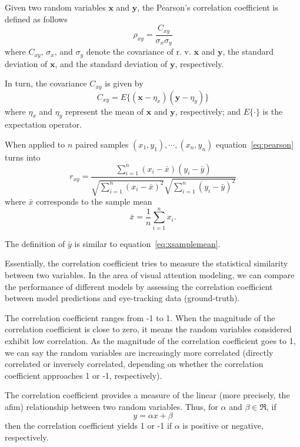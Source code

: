 Given two random variables $\mathbf{x}$ and $\mathbf{y}$, the Pearson's correlation coefficient is defined as follows
\begin{equation}
  \rho_{xy} = \frac{C_{xy}}{\sigma_x\sigma_y}
  \label{eq:pearson}
\end{equation}
where $C_{xy}$, $\sigma_x$, and $\sigma_y$ denote the covariance of r. v. $\mathbf{x}$ and $\mathbf{y}$, the standard deviation of $\mathbf{x}$, and the standard deviation of $\mathbf{y}$, respectively.

In turn, the covariance $C_{xy}$ is given by
\begin{equation}
  C_{xy} = E\{(\mathbf{x}-\eta_x)(\mathbf{y} - \eta_y)\}
  \label{eq:cov}
\end{equation}
where $\eta_x$ and $\eta_y$ represent the mean of $\mathbf{x}$ and $\mathbf{y}$, respectively; and $E\{\cdot\}$ is the expectation operator.

When applied to $n$ paired samples $(x_1,y_1),\cdots,(x_n,y_n)$ equation~\ref{eq:pearson} turns into
\begin{equation}
  r_{xy} = \frac{\sum_{i=1}^n(x_i-\bar x)(y_i - \bar y)}{\sqrt{\sum_{i=1}^n(x_i-\bar x)^2}\sqrt{\sum_{i=1}^n(y_i-\bar y)^2}}
\end{equation}
where $\bar x$ corresponds to the sample mean
\begin{equation}
  \bar x = \frac{1}{n}\sum_{i=1}^n x_i.
  \label{eq:xsamplemean}
\end{equation}

The definition of $\bar y$ is similar to equation~\ref{eq:xsamplemean}.

Essentially, the correlation coefficient tries to measure the statistical similarity between two variables. In the area of visual attention modeling, we can compare the performance of different models by assessing the correlation coefficient between model predictions and eye-tracking data (ground-truth).

The correlation coefficient ranges from -1 to 1. When the magnitude of the correlation coefficient is close to zero, it means the random variables considered exhibit low correlation. As the magnitude of the correlation coefficient goes to 1, we can say the random variables are increasingly more correlated (directly correlated or inversely correlated, depending on whether the correlation coefficient approaches 1 or -1, respectively).

The correlation coefficient provides a measure of the linear (more precisely, the afim) relationship between two random variables. Thus, for $\alpha$ and $\beta \in \Re$, if 
\begin{equation}
	y = \alpha x + \beta
	\label{eq:afim}
\end{equation}
then the correlation coefficient yields 1 or -1 if $\alpha$ is positive or negative, respectively.

